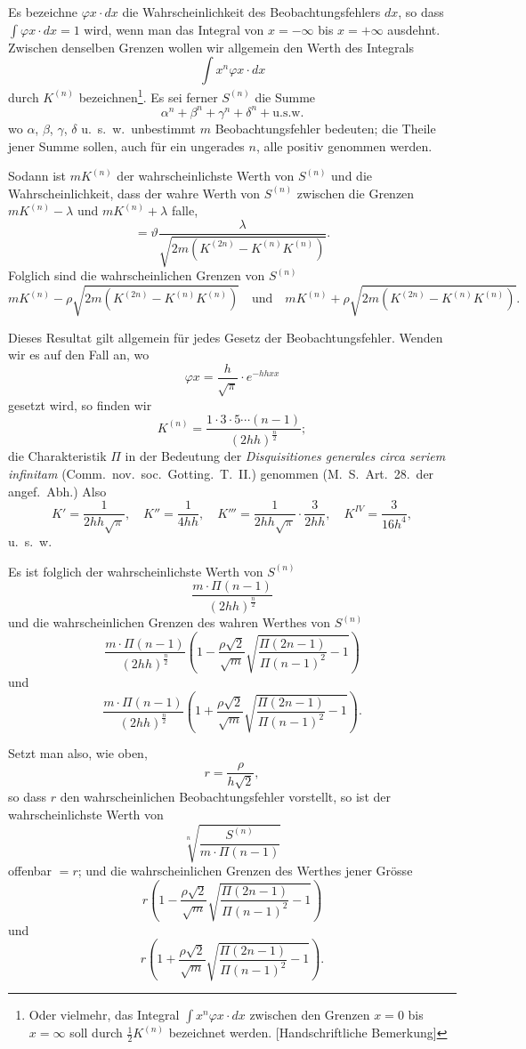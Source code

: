 \documentclass[12pt,a4paper]{article}
\begin{document}
Es bezeichne $\varphi x \cdot dx$ die Wahrscheinlichkeit des Beobachtungsfehlers $dx$, so dass $\int\varphi x \cdot dx = 1$ wird, wenn man das Integral von $x = -\infty$ bis $x = +\infty$ ausdehnt. Zwischen denselben Grenzen wollen wir allgemein den Werth des Integrals
\[
\int x^{n}\varphi x \cdot dx
\]
durch $K^{(n)}$ bezeichnen\footnote{Oder vielmehr, das Integral $\int x^{n}\varphi x \cdot dx$ zwischen den Grenzen $x = 0$ bis $x = \infty$ soll durch $\frac{1}{2}K^{(n)}$ bezeichnet werden. [Handschriftliche Bemerkung]}. Es sei ferner $S^{(n)}$ die Summe
\[
\alpha^{n} + \beta^{n} + \gamma^{n} + \delta^{n} + \text{u.s.w.}
\]
wo $\alpha$, $\beta$, $\gamma$, $\delta$ u.\ s.\ w.\ unbestimmt $m$ Beobachtungsfehler bedeuten; die Theile jener Summe sollen, auch f\"ur ein ungerades $n$, alle positiv genommen werden.

Sodann ist $mK^{(n)}$ der wahrscheinlichste Werth von $S^{(n)}$ und die Wahrscheinlichkeit, dass der wahre Werth von $S^{(n)}$ zwischen die Grenzen $mK^{(n)} - \lambda$ und $mK^{(n)} + \lambda$ falle,
\[
= \vartheta\frac{\lambda}{\sqrt{2m\left(K^{(2n)} - K^{(n)}K^{(n)}\right)}}.
\]
Folglich sind die wahrscheinlichen Grenzen von $S^{(n)}$
\[
mK^{(n)} - \rho\sqrt{2m\left(K^{(2n)} - K^{(n)}K^{(n)}\right)}
\quad\text{und}\quad
mK^{(n)} + \rho\sqrt{2m\left(K^{(2n)} - K^{(n)}K^{(n)}\right)}.
\]

Dieses Resultat gilt allgemein f\"ur jedes Gesetz der Beobachtungsfehler. Wenden wir es auf den Fall an, wo
\[
\varphi x = \frac{h}{\sqrt{\pi}} \cdot e^{-hhxx}
\]
gesetzt wird, so finden wir
\[
K^{(n)} = \frac{1 \cdot 3 \cdot 5 \cdots (n-1)}{(2hh)^{\frac{n}{2}}};
\]
die Charakteristik $\Pi$ in der Bedeutung der \textit{Disquisitiones generales circa seriem infinitam} (Comm.\ nov.\ soc.\ Gotting.\ T.\ II.) genommen (M.\ S.\ Art.\ 28.\ der angef.\ Abh.) Also
\[
K' = \frac{1}{2hh\sqrt{\pi}}, \quad K'' = \frac{1}{4hh}, \quad K''' = \frac{1}{2hh\sqrt{\pi}} \cdot \frac{3}{2hh}, \quad K^{IV} = \frac{3}{16h^{4}},
\]
u.\ s.\ w.

Es ist folglich der wahrscheinlichste Werth von $S^{(n)}$
\[
\frac{m \cdot \Pi(n-1)}{(2hh)^{\frac{n}{2}}}
\]
und die wahrscheinlichen Grenzen des wahren Werthes von $S^{(n)}$
\[
\frac{m \cdot \Pi(n-1)}{(2hh)^{\frac{n}{2}}} \left(1 - \frac{\rho\sqrt{2}}{\sqrt{m}}\sqrt{\frac{\Pi(2n-1)}{\Pi(n-1)^{2}} - 1}\right)
\]
und
\[
\frac{m \cdot \Pi(n-1)}{(2hh)^{\frac{n}{2}}} \left(1 + \frac{\rho\sqrt{2}}{\sqrt{m}}\sqrt{\frac{\Pi(2n-1)}{\Pi(n-1)^{2}} - 1}\right).
\]

Setzt man also, wie oben,
\[
r = \frac{\rho}{h\sqrt{2}},
\]
so dass $r$ den wahrscheinlichen Beobachtungsfehler vorstellt, so ist der wahrscheinlichste Werth von
\[
\sqrt[n]{\frac{S^{(n)}}{m \cdot \Pi(n-1)}}
\]
offenbar $= r$; und die wahrscheinlichen Grenzen des Werthes jener Gr\"osse
\[
r\left(1 - \frac{\rho\sqrt{2}}{\sqrt{m}}\sqrt{\frac{\Pi(2n-1)}{\Pi(n-1)^{2}} - 1}\right)
\]
und
\[
r\left(1 + \frac{\rho\sqrt{2}}{\sqrt{m}}\sqrt{\frac{\Pi(2n-1)}{\Pi(n-1)^{2}} - 1}\right).
\]
\end{document}
